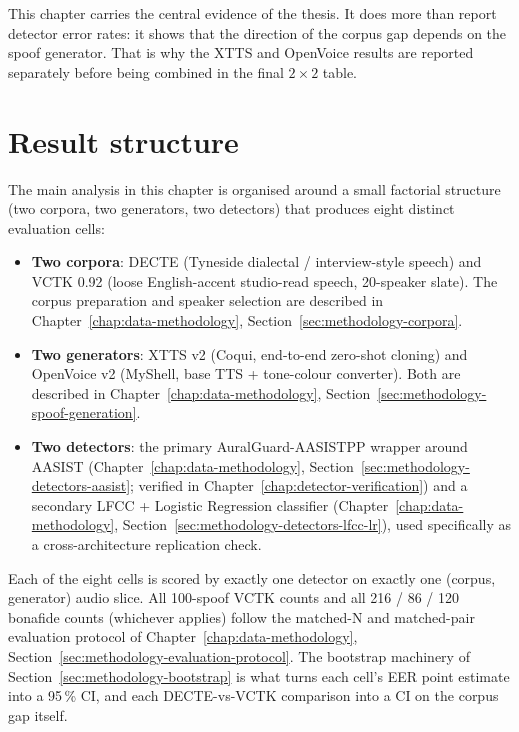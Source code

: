 This chapter carries the central evidence of the thesis. It does
more than report detector error rates: it shows that the direction
of the corpus gap depends on the spoof generator. That is why the
XTTS and OpenVoice results are reported separately before being
combined in the final $2 \times 2$ table.


\section{Result structure}
\label{sec:main-results-design}

The main analysis in this chapter is organised around a small
factorial structure (two corpora, two generators, two detectors)
that produces eight distinct evaluation cells:

\begin{itemize}
    \item \textbf{Two corpora}: DECTE (Tyneside dialectal / interview-style
        speech) and VCTK 0.92 (loose English-accent studio-read speech,
        20-speaker slate). The corpus preparation and speaker selection
        are described in Chapter~\ref{chap:data-methodology}, Section~\ref{sec:methodology-corpora}.
    \item \textbf{Two generators}: XTTS v2 (Coqui, end-to-end zero-shot cloning)
        and OpenVoice v2 (MyShell, base TTS + tone-colour converter).
        Both are described in Chapter~\ref{chap:data-methodology}, Section~\ref{sec:methodology-spoof-generation}.
    \item \textbf{Two detectors}: the primary AuralGuard-AASISTPP wrapper around
        AASIST (Chapter~\ref{chap:data-methodology}, Section~\ref{sec:methodology-detectors-aasist}; verified in Chapter~\ref{chap:detector-verification}) and a
        secondary LFCC + Logistic Regression classifier (Chapter~\ref{chap:data-methodology},
        Section~\ref{sec:methodology-detectors-lfcc-lr}), used specifically as a cross-architecture
        replication check.
\end{itemize}

Each of the eight cells is scored by exactly one detector on
exactly one (corpus, generator) audio slice. All 100-spoof VCTK
counts and all 216 / 86 / 120 bonafide counts (whichever applies)
follow the matched-N and matched-pair evaluation protocol of
Chapter~\ref{chap:data-methodology}, Section~\ref{sec:methodology-evaluation-protocol}. The bootstrap machinery of Section~\ref{sec:methodology-bootstrap} is
what turns each cell's EER point estimate into a 95\,\% CI, and each
DECTE-vs-VCTK comparison into a CI on the corpus gap itself.

